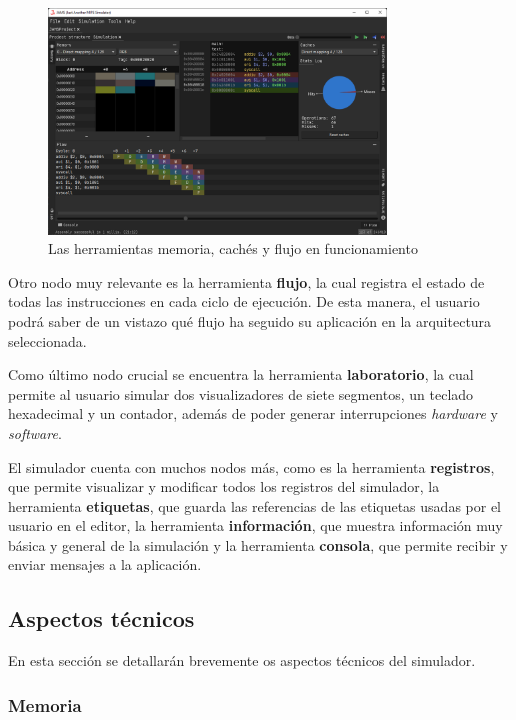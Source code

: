 \begin{figure}[h]
    \centering
    \includegraphics[width=0.8\textwidth]{images/tools/jams-memory-cache-flow}
    \caption{Las herramientas memoria, cachés y flujo en funcionamiento}
    \label{fig:jams-memory-cache-flow}
\end{figure}

Otro nodo muy relevante es la herramienta \textbf{flujo},
la cual registra el estado de todas las instrucciones en cada ciclo
de ejecución.
De esta manera, el usuario podrá saber de un vistazo qué flujo
ha seguido su aplicación en la arquitectura seleccionada.

Como último nodo crucial se encuentra la herramienta
\textbf{laboratorio}, la cual permite al usuario simular
dos visualizadores de siete segmentos, un teclado hexadecimal
y un contador, además de poder generar interrupciones \textit{hardware}
y \textit{software}.

El simulador cuenta con muchos nodos más, como es la
herramienta \textbf{registros}, que permite visualizar y modificar
todos los registros del simulador, la herramienta \textbf{etiquetas},
que guarda las referencias de las etiquetas usadas por el usuario
en el editor, la herramienta \textbf{información}, que muestra
información muy básica y general de la simulación y la
herramienta \textbf{consola}, que permite recibir y enviar
mensajes a la aplicación.

\subsection{Aspectos técnicos}\label{subsec:aspectos-tecnicos}

En esta sección se detallarán brevemente os aspectos técnicos
 del simulador.

\subsubsection{Memoria}\label{subsubsec:memoria}

